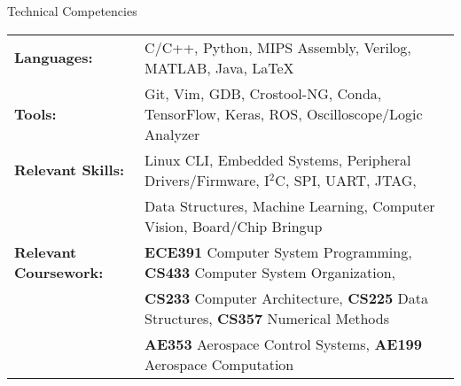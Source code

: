 \documentclass{resume} %
\begin{document}

    \begin{rSection} {Technical Competencies}

        \begin{tabular}{ @{} >{\bfseries}l @{\hspace{2ex}} l }

        Languages: & C/C++, Python, MIPS Assembly, Verilog, MATLAB, Java, LaTeX \\
        Tools: & Git, Vim, GDB, Crostool-NG, Conda, TensorFlow, Keras, ROS, Oscilloscope/Logic Analyzer \\
        Relevant Skills: & Linux CLI, Embedded Systems, Peripheral Drivers/Firmware, I$^2$C, SPI, UART, JTAG, \\ & Data Structures, Machine Learning, Computer Vision, Board/Chip Bringup \\
		Relevant Coursework: & \textbf{ECE391} Computer System Programming, \textbf{CS433} Computer System Organization,\\ & \textbf{CS233} Computer Architecture, \textbf{CS225} Data Structures, \textbf{CS357} Numerical Methods \\ & \textbf{AE353} Aerospace Control Systems, \textbf{AE199} Aerospace Computation

        \end{tabular}

    \end{rSection}


\end{document}
